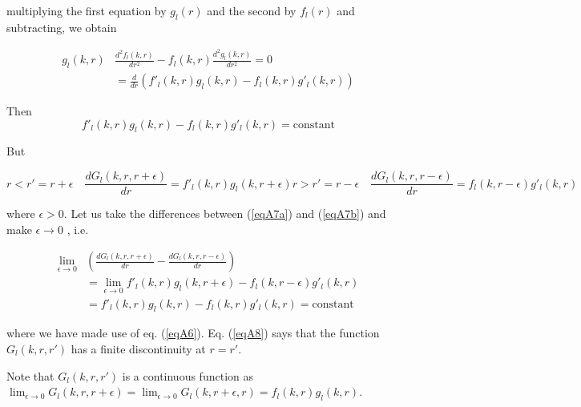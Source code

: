 \documentclass[a4paper,14pt]{book}
\begin{document}
multiplying the first equation by $g_l(r)$ and the second by $f_l(r)$ and subtracting, we obtain


 \begin{equation}\label{eqA5}
\begin{split}
g_l(k,r)& \frac{d^2 f_l(k,r)}{dr^2}-f_l(k,r) \frac{d^2 g_l(k,r)}{dr^2}=0\\
&=\frac{d}{dr}(f'_l(k,r)g_l(k,r)-f_l(k,r)g'_l(k,r))
\end{split}
\end{equation}

Then
 \begin{equation}\label{eqA6}
f'_l(k,r)g_l(k,r)-f_l(k,r)g'_l(k,r)=\text{constant}
\end{equation}

But

\begin{subequations}
 \begin{equation}\label{eqA7a}
r<r'=r+\epsilon \quad \frac{dG_l(k,r,r+\epsilon)}{dr}=f'_l(k,r)g_l(k,r+\epsilon)
\end{equation}



\begin{equation}\label{eqA7b}
r>r'=r-\epsilon \quad \frac{dG_l(k,r,r-\epsilon)}{dr}=f_l(k,r-\epsilon)g'_l(k,r)
\end{equation}
\end{subequations}

where $\epsilon>0$. Let us take the differences between (\ref{eqA7a}) and (\ref{eqA7b}) and make $\epsilon \rightarrow 0$ , i.e.


\begin{equation}\label{eqA8}
\begin{split}
\lim_{\epsilon \rightarrow 0}& \left( \frac{dG_l(k,r,r+\epsilon)}{dr}-\frac{dG_l(k,r,r-\epsilon)}{dr}\right) \\
& =\lim_{\epsilon \rightarrow 0} f'_l(k,r)g_l(k,r+\epsilon)-f_l(k,r-\epsilon)g'_l(k,r)\\
&=f'_l(k,r)g_l(k,r)-f_l(k,r)g'_l(k,r)=\text{constant}
\end{split}
\end{equation}

where we have made use of eq. (\ref{eqA6}). Eq. (\ref{eqA8}) says that the function $G_l(k,r,r')$ has a finite discontinuity at $r=r'$.

Note that $G_l(k,r,r')$ is a continuous function as $\lim_{\epsilon \rightarrow 0} G_l(k,r,r+\epsilon)=\lim_{\epsilon \rightarrow 0} G_l(k,r+\epsilon,r)=f_l(k,r)g_l(k,r)$.
\end{document}
